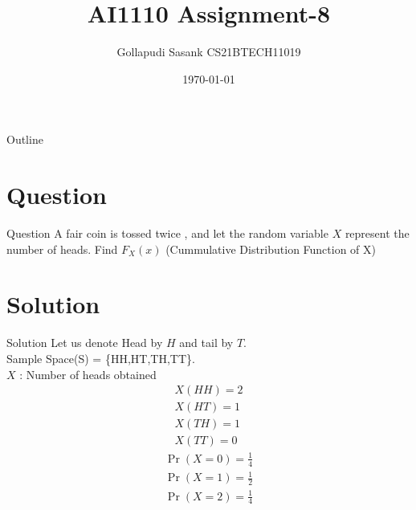 \documentclass{beamer}
\title{AI1110 Assignment-8}
\author{Gollapudi Sasank CS21BTECH11019}
\date{\today}
\providecommand{\pr}[1]{\ensuremath{\Pr\left(#1\right)}}
\begin{document}
\begin{frame}
    \titlepage 
\end{frame}

\logo{}


\begin{frame}{Outline}
    \tableofcontents
\end{frame}


\section{Question}
\begin{frame}{Question}
A fair coin is tossed twice , and let the random variable $X$ represent the number of heads. Find $F_X(x)$ (Cummulative Distribution Function of X) 
\end{frame}


\section{Solution}
\begin{frame}{Solution}
Let us denote Head by $H$ and tail by $T$. \\
Sample Space(S) = \{HH,HT,TH,TT\}.\\
$X$ : Number of heads obtained
\begin{align}
X(HH) = 2 \\
X(HT) = 1 \\
X(TH) = 1 \\
X(TT) = 0 
\end{align}
\begin{align}
\pr{X=0} = \frac{1}{4} \\
\pr{X=1} = \frac{1}{2} \\
\pr{X=2} = \frac{1}{4}
\end{align}
\end{frame} 
\end{document}
